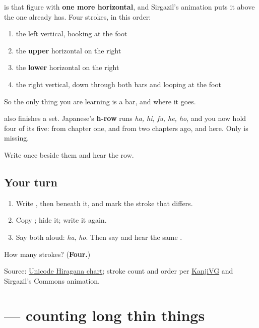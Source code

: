 \textbf{} is that figure with \textbf{one more horizontal}, and Sirgazil's animation puts it above the one \textbf{} already has. Four strokes, in this order:

\begin{enumerate}
\raggedright
  \item the left vertical, hooking at the foot
  \item the \textbf{upper} horizontal on the right
  \item the \textbf{lower} horizontal on the right
  \item the right vertical, down through both bars and looping at the foot
\end{enumerate}

So the only thing you are learning is a bar, and where it goes.

\textbf{} also finishes a set. Japanese's \textbf{h-row} runs \emph{ha, hi, fu, he, ho}, and you now hold four of its five: \textbf{} from chapter one, \textbf{} and \textbf{} from two chapters ago, and \textbf{} here. Only \textbf{} is missing.

Write \textbf{} once beside them and hear the row.

\subsection*{Your turn}
\begin{enumerate}
\raggedright
  \item Write \textbf{}, then \textbf{} beneath it, and mark the stroke that differs.
  \item Copy \textbf{}; hide it; write it again.
  \item Say both aloud: \emph{ha}, \emph{ho}. Then say \textbf{} and hear the same \textbf{}.
\end{enumerate}

\begin{tcolorbox}[breakable,colback=teal!4,colframe=teal!35!black,title={Before you move on}]
How many strokes? (\textbf{Four.})

Source: \href{https://www.unicode.org/charts/PDF/U3040.pdf}{Unicode Hiragana chart}; stroke count and order per \href{https://kanjivg.tagaini.net/kanjivg/kanji/0307b.html}{KanjiVG} and Sirgazil's Commons animation.
\end{tcolorbox}
\section[\texorpdfstring{\ja{ほん} (-hon)}{ほん (-hon)}]{ — counting long thin things}

